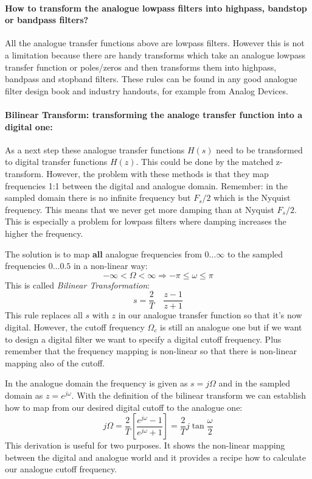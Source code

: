 \documentclass[12pt,a4paper]{article}
\begin{document}
\paragraph{How to transform the analogue lowpass filters into
  highpass, bandstop or bandpass filters?}
All the analogue transfer functions above are lowpass
filters. However this is not a limitation because there are handy transforms
which take an analogue lowpass transfer function or poles/zeros
and then transforms them into highpass, bandpass and stopband
filters. These rules can be found in any good analogue filter
design book and industry handouts, for example from Analog Devices.

\paragraph{Bilinear Transform: transforming the analoge transfer function into a digital one:}
As a next step these analogue transfer functions $H(s)$ need to be
transformed to digital transfer functions $H(z)$. This could be done
by the matched z-transform. However, the problem with these methods is that
they map frequencies 1:1 between the digital and analogue
domain. Remember: in the sampled domain there is no infinite frequency
but $F_s/2$ which is the Nyquist frequency.  This means that we never
get more damping than at Nyquist $F_s/2$.  This is especially a
problem for lowpass filters where damping increases the higher the
frequency.

The solution is to map {\bf all} analogue frequencies from $0 \ldots \infty$
to the sampled frequencies $0\ldots 0.5$ in a non-linear way:
\begin{equation} 
- \infty < \Omega < \infty \Rightarrow -\pi \leq \omega \leq \pi 
\end{equation}
This is called \textsl{Bilinear Transformation}:
\begin{equation} 
s = \frac{2}{T} \quad \frac{z - 1}{z + 1}
\end{equation}
This rule replaces all $s$ with $z$ in our analogue transfer
function so that it's now digital. However, the cutoff frequency $\Omega_c$
is still an analogue one but if we want to design a digital filter
we want to specify a digital cutoff frequency. Plus remember that
the frequency mapping is non-linear so that there is non-linear
mapping also of the cutoff. 

In the analogue domain the
frequency is given as $s = j\Omega$ and in the sampled domain as
$z = e^{j \omega}$. With the definition of the bilinear transform
we can establish how to map from our desired digital cutoff to
the analogue one:
\begin{equation} 
j \Omega = \frac{2}{T} \left[\frac{e^{j \omega} - 1}{e^{j \omega} +1}\right] = \frac{2}{T} j \tan \frac{\omega}{2}
\end{equation}
This derivation is useful for two purposes. It shows the non-linear
mapping between the digital and analogue world and it provides
a recipe how to calculate our analogue cutoff frequency.
\end{document}
